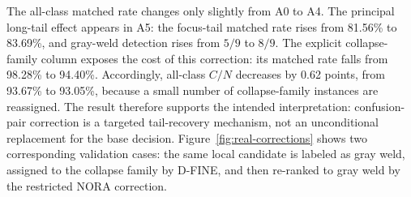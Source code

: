 The all-class matched rate changes only slightly from A0 to A4. The principal long-tail effect appears in A5: the focus-tail matched rate rises from 81.56\% to 83.69\%, and gray-weld detection rises from $5/9$ to $8/9$. The explicit collapse-family column exposes the cost of this correction: its matched rate falls from 98.28\% to 94.40\%. Accordingly, all-class $C/N$ decreases by 0.62 points, from 93.67\% to 93.05\%, because a small number of collapse-family instances are reassigned. The result therefore supports the intended interpretation: confusion-pair correction is a targeted tail-recovery mechanism, not an unconditional replacement for the base decision. Figure~\ref{fig:real-corrections} shows two corresponding validation cases: the same local candidate is labeled as gray weld, assigned to the collapse family by D-FINE, and then re-ranked to gray weld by the restricted NORA correction.

